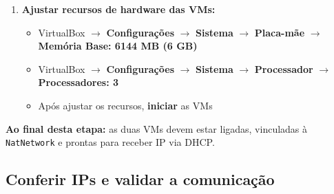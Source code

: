 \begin{enumerate}

\item \textbf{Ajustar recursos de hardware das VMs:}
  \begin{itemize}
    \item VirtualBox $\rightarrow$ \textbf{Configurações} $\rightarrow$ \textbf{Sistema} $\rightarrow$ \textbf{Placa-mãe} $\rightarrow$ \textbf{Memória Base: 6144 MB (6 GB)}
    \item VirtualBox $\rightarrow$ \textbf{Configurações} $\rightarrow$ \textbf{Sistema} $\rightarrow$ \textbf{Processador} $\rightarrow$ \textbf{Processadores: 3}
    \item Após ajustar os recursos, \textbf{iniciar} as VMs
  \end{itemize}

\end{enumerate}

\begin{notebox}
\textbf{Ao final desta etapa:} as duas VMs devem estar ligadas, vinculadas à \texttt{NatNetwork} e prontas para receber IP via DHCP.
\end{notebox}

\subsection{Conferir IPs e validar a comunicação}

